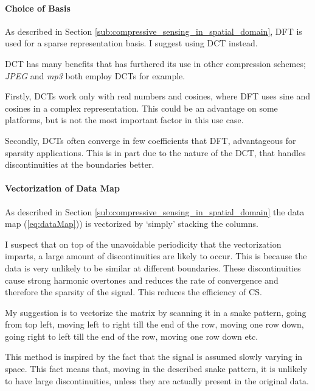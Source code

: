 \documentclass[Main]{subfiles}
\begin{document}
			\paragraph{Choice of Basis} %
			\label{par:choice_of_basis}
			
				As described in Section \ref{sub:compressive_sensing_in_spatial_domain}, DFT is used for a sparse representation basis.
				I suggest using DCT instead.

				DCT has many benefits that has furthered its use in other compression schemes; \emph{JPEG} and \emph{mp3} both employ DCTs for example.

				Firstly, DCTs work only with real numbers and cosines, where DFT uses sine and cosines in a complex representation. This could be an advantage on some platforms, but is not the most important factor in this use case.

				Secondly, DCTs often converge in few coefficients that DFT, advantageous for sparsity applications.
				This is in part due to the nature of the DCT, that handles discontinuities at the boundaries better.


			\paragraph{Vectorization of Data Map} %
			\label{par:vectorization_of_data_map}

				As described in Section \ref{sub:compressive_sensing_in_spatial_domain} the data map (\ref{eq:dataMap})) is vectorized by `simply' stacking the columns.

				I suspect that on top of the unavoidable periodicity that the vectorization imparts, a large amount of discontinuities are likely to occur.
				This is because the data is very unlikely to be similar at different boundaries.
				These discontinuities cause strong harmonic overtones and reduces the rate of convergence and therefore the sparsity of the signal.
				This reduces the efficiency of CS.

				My suggestion is to vectorize the matrix by scanning it in a snake pattern, going from top left, moving left to right till the end of the row, moving one row down, going right to left till the end of the row, moving one row down etc.

				This method is inspired by the fact that the signal is assumed slowly varying in space.
				This fact means that, moving in the described snake pattern, it is unlikely to have large discontinuities, unless they are actually present in the original data.

		


\end{document}
